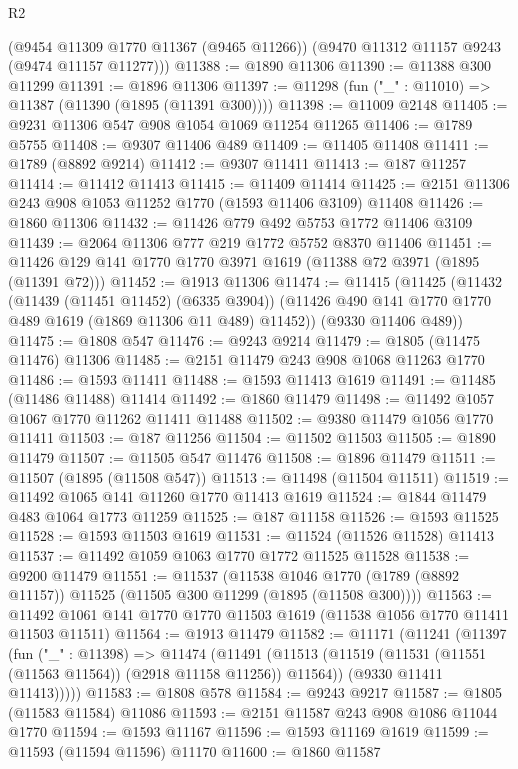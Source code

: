 \begin{lexlean}{R2}
\begin{coremodule}
      (@9454 @11309 @1770 @11367 (@9465 @11266))
      (@9470 @11312 @11157 @9243 (@9474 @11157 @11277)))
@11388 := @1890 @11306
@11390 := @11388 @300 @11299
@11391 := @1896 @11306
@11397 := @11298 (fun ("_" : @11010) => @11387 (@11390 (@1895 (@11391 @300))))
@11398 := @11009 @2148
@11405 := @9231 @11306 @547 @908 @1054 @1069 @11254 @11265
@11406 := @1789 @5755
@11408 := @9307 @11406 @489
@11409 := @11405 @11408
@11411 := @1789 (@8892 @9214)
@11412 := @9307 @11411
@11413 := @187 @11257
@11414 := @11412 @11413
@11415 := @11409 @11414
@11425 := @2151 @11306 @243 @908 @1053 @11252 @1770 (@1593 @11406 @3109) @11408
@11426 := @1860 @11306
@11432 := @11426 @779 @492 @5753 @1772 @11406 @3109
@11439 := @2064 @11306 @777 @219 @1772 @5752 @8370 @11406
@11451 := @11426 @129 @141 @1770 @1770 @3971 @1619 (@11388 @72 @3971 (@1895 (@11391 @72)))
@11452 := @1913 @11306
@11474 := @11415
    (@11425
      (@11432
        (@11439 (@11451 @11452) (@6335 @3904))
        (@11426 @490 @141 @1770 @1770 @489 @1619 (@1869 @11306 @11 @489) @11452))
      (@9330 @11406 @489))
@11475 := @1808 @547
@11476 := @9243 @9214
@11479 := @1805 (@11475 @11476) @11306
@11485 := @2151 @11479 @243 @908 @1068 @11263 @1770
@11486 := @1593 @11411
@11488 := @1593 @11413 @1619
@11491 := @11485 (@11486 @11488) @11414
@11492 := @1860 @11479
@11498 := @11492 @1057 @1067 @1770 @11262 @11411 @11488
@11502 := @9380 @11479 @1056 @1770 @11411
@11503 := @187 @11256
@11504 := @11502 @11503
@11505 := @1890 @11479
@11507 := @11505 @547 @11476
@11508 := @1896 @11479
@11511 := @11507 (@1895 (@11508 @547))
@11513 := @11498 (@11504 @11511)
@11519 := @11492 @1065 @141 @11260 @1770 @11413 @1619
@11524 := @1844 @11479 @483 @1064 @1773 @11259
@11525 := @187 @11158
@11526 := @1593 @11525
@11528 := @1593 @11503 @1619
@11531 := @11524 (@11526 @11528) @11413
@11537 := @11492 @1059 @1063 @1770 @1772 @11525 @11528
@11538 := @9200 @11479
@11551 := @11537
    (@11538 @1046 @1770 (@1789 (@8892 @11157)) @11525 (@11505 @300 @11299 (@1895 (@11508 @300))))
@11563 := @11492 @1061 @141 @1770 @1770 @11503 @1619 (@11538 @1056 @1770 @11411 @11503 @11511)
@11564 := @1913 @11479
@11582 := @11171
    (@11241
      (@11397
        (fun ("_" : @11398) =>
        @11474
          (@11491
            (@11513 (@11519 (@11531 (@11551 (@11563 @11564)) (@2918 @11158 @11256)) @11564))
            (@9330 @11411 @11413)))))
@11583 := @1808 @578
@11584 := @9243 @9217
@11587 := @1805 (@11583 @11584) @11086
@11593 := @2151 @11587 @243 @908 @1086 @11044 @1770
@11594 := @1593 @11167
@11596 := @1593 @11169 @1619
@11599 := @11593 (@11594 @11596) @11170
@11600 := @1860 @11587

\end{coremodule}
\end{lexlean}
